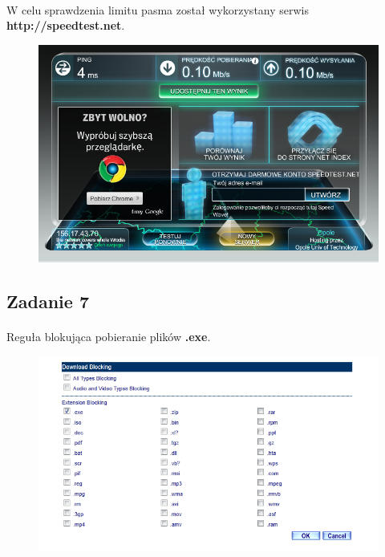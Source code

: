 \documentclass[wide,a4paper,titlepage,12pt] {article}
\begin{document}
  \paragraph{}
  W celu sprawdzenia limitu pasma został wykorzystany serwis \textbf{http://speedtest.net}.
  \begin{figure}[h!]
    \begin{center}
      \includegraphics[width=\textwidth]{7.PNG}
    \end{center}
  \end{figure}



  \subsection{Zadanie 7}
  \paragraph{}
  Reguła blokująca pobieranie plików \textbf{.exe}.
  \begin{figure}[h!]
    \begin{center}
      \includegraphics[width=\textwidth]{blocking_exe.PNG}
    \end{center}
  \end{figure}
\end{document}
